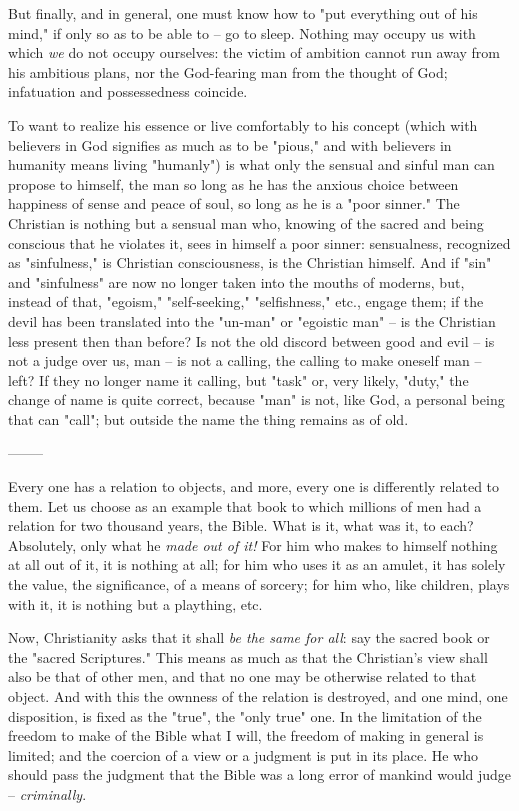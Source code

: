 \documentclass[a4paper]{book}
\begin{document}
But finally, and in general, one must know how to "{}put everything out of his 
mind,"{} if only so as to be able to -- go to sleep. Nothing may occupy us 
with which \textit{we} do not occupy ourselves: the victim of ambition cannot 
run away from his ambitious plans, nor the God-fearing man from the thought of 
God; infatuation and possessedness coincide.

To want to realize his essence or live comfortably to his concept (which with 
believers in God signifies as much as to be "{}pious,"{} and with believers in 
humanity means living "{}humanly"{}) is what only the sensual and sinful man 
can propose to himself, the man so long as he has the anxious choice between 
happiness of sense and peace of soul, so long as he is a "{}poor sinner."{} 
The Christian is nothing but a sensual man who, knowing of the sacred and 
being conscious that he violates it, sees in himself a poor sinner: 
sensualness, recognized as "{}sinfulness,"{} is Christian consciousness, is 
the Christian himself. And if "{}sin"{} and "{}sinfulness"{} are now no longer 
taken into the mouths of moderns, but, instead of that, "{}egoism,"{} 
"{}self-seeking,"{} "{}selfishness,"{} etc., engage them; if the devil has 
been translated into the "{}un-man"{} or "{}egoistic man"{} -- is the 
Christian less present then than before? Is not the old discord between good 
and evil -- is not a judge over us, man -- is not a calling, the calling to 
make oneself man -- left? If they no longer name it calling, but "{}task"{} 
or, very likely, "{}duty,"{} the change of name is quite correct, because 
"{}man"{} is not, like God, a personal being that can "{}call"{}; but outside 
the name the thing remains as of old.

\begin{center}
--------\end{center}


Every one has a relation to objects, and more, every one is differently 
related to them. Let us choose as an example that book to which millions of 
men had a relation for two thousand years, the Bible. What is it, what was it, 
to each? Absolutely, only what he \textit{made out of it!} For him who makes 
to himself nothing at all out of it, it is nothing at all; for him who uses it 
as an amulet, it has solely the value, the significance, of a means of 
sorcery; for him who, like children, plays with it, it is nothing but a 
plaything, etc.

Now, Christianity asks that it shall \textit{be the same for all}: say the 
sacred book or the "{}sacred Scriptures."{} This means as much as that the 
Christian's view shall also be that of other men, and that no one may be 
otherwise related to that object. And with this the ownness of the relation is 
destroyed, and one mind, one disposition, is fixed as the "{}true"{}, the 
"{}only true"{} one. In the limitation of the freedom to make of the Bible 
what I will, the freedom of making in general is limited; and the coercion of 
a view or a judgment is put in its place. He who should pass the judgment that 
the Bible was a long error of mankind would judge -- \textit{criminally}.
\end{document}
